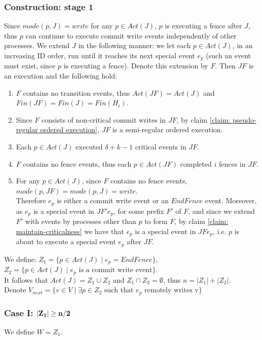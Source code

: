 \subsubsection{Construction: stage 1}
Since $mode(p,J) = write$ for any $p \in Act(J)$, $p$ is executing a fence after $J$, thus $p$ can continue to execute commit write events independently of other processes. We extend $J$ in the following manner: we let each $p \in Act(J)$, in an increasing ID order, run until it reaches its next special event $e_p$ (such an event must exist, since $p$ is executing a fence). Denote this extension by $F$. Then $J F$ is an execution and the following hold:
\begin{enumerate}
	\item $F$ contains no transition events, thus $Act(J F) = Act(J)$ and $Fin(J F) = Fin(J) = Fin(H_i)$.
	\item Since $F$ consists of non-critical commit writes in $J F$, by claim \ref{claim: pseudo-regular ordered execution}, $J F$ is a semi-regular ordered execution.
	\item Each $p \in Act(J)$ executed $\delta+k-1$ critical events in $J F$.
	\item $F$ contains no fence events, thus each $p \in Act(J F)$ completed $i$ fences in $J F$.
	\item For any $p \in Act(J)$, since $F$ contains no fence events, $mode(p,J F) = mode(p,J) = write$.
	\\ Therefore $e_p$ is either a commit write event or an $EndFence$ event. Moreover, as $e_p$ is a special event in $J F' e_p$, for some prefix $F'$ of $F$, and since we extend $F'$ with events by processes other than $p$ to form $F$, by claim \ref{claim: maintain-criticalness} we have that $e_p$ is a special event in $J F e_p$, i.e. $p$ is about to execute a special event $e_p$ after $J F$.
\end{enumerate}
We define: $Z_1 = \{p \in Act(J) \mid e_p = EndFence\}$, $Z_2 = \{p \in Act(J) \mid e_p \text{ is a commit write event}\}$.
\\It follows that $Act(J) = Z_1 \cup Z_2$ and $Z_1 \cap Z_2 = \emptyset$, thus $n = |Z_1|+|Z_2|$.
\\ Denote $V_{next} = \{v \in V \mid \exists p \in Z_2 \text{ such that } e_p \text{ remotely writes v}\}$

\subsubsection*{\hspace{5mm} Case I: $\bf |Z_1| \geq n/2$}
We define $W = Z_1$.

